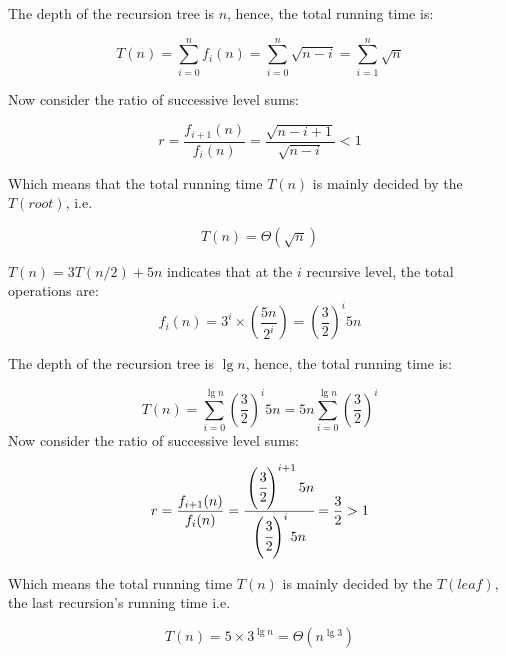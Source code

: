 \begin{homeworkProblem}
\begin{homeworkSubProblem}[$T(n) = T(n-1) + \sqrt{n}$]
The depth of the recursion tree is $n$, hence, the total running time is:

\[T(n) =\sum_{i=0}^n f_i(n) = \sum_{i=0}^n \sqrt{n-i} = \sum_{i=1}^n \sqrt n\]

Now consider the ratio of successive level sums:

\begin{equation*}
r = \frac{f_{i+1}(n)}{f_i(n)}
  = \frac{\sqrt{n-i+1}}{\sqrt{n-i}}
  < 1
\end{equation*}

Which means that the total running time $T(n)$ is mainly decided by the $T(root)$, i.e.

\begin{equation} \label{eq:6.4}
T(n) = \Theta(\sqrt n)
\end{equation}

\end{homeworkSubProblem}

\begin{homeworkSubProblem}[$T(n)=3T(n/2)+5n$]
$T(n)=3T(n/2)+5n$ indicates that at the $i$ recursive level, the total
operations are:
\begin{equation*}
f_i(n) = 3^i\times\left(\frac{5n}{2^i}\right)
       = \left(\frac{3}{2}\right)^i 5n
\end{equation*}

The depth of the recursion tree is $\lg n$, hence, the total running time is:

\begin{equation*}
T(n) =\sum_{i=0}^{\lg n}\left(\frac{3}{2}\right)^i 5n
     =5n\sum_{i=0}^{\lg n}\left(\frac{3}{2}\right)^i
\end{equation*}
Now consider the ratio of successive level sums:

\begin{equation*}
r = \frac{f_{i+1}(n)}{f_i(n)}
  = \cfrac{\left(\cfrac{3}{2}\right)^{i+1} 5n}{\left(\cfrac{3}{2}\right)^i 5n}
  = \frac{3}{2}
  > 1
\end{equation*}

Which means the total running time $T(n)$ is mainly decided by the $T(leaf)$, the last recursion's running time i.e.

\begin{equation}
T(n) = 5 \times 3^{\lg n}= \Theta(n^{\lg3})
\end{equation}

\end{homeworkSubProblem}

\begin{homeworkSubProblem}[$T(n)=T(\sqrt{n})+7$]


\end{homeworkSubProblem}
\end{homeworkProblem}
